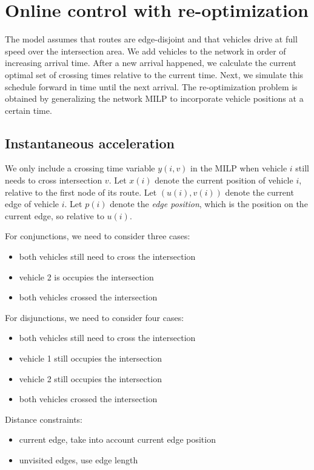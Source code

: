 \documentclass[a4paper]{article}
\author{Jeroen van Riel}
\date{\monthyeardate\today}
\title{}
\theoremstyle{definition}
\theoremstyle{plain}
\begin{document}
\section*{Online control with re-optimization}

The model assumes that routes are edge-disjoint and that vehicles drive at full
speed over the intersection area.
%
We add vehicles to the network in order of increasing arrival time. After a new
arrival happened, we calculate the current optimal set of crossing times
relative to the current time. Next, we simulate this schedule forward in time
until the next arrival.
%
The re-optimization problem is obtained by generalizing the network MILP to
incorporate vehicle positions at a certain time.

\subsection*{Instantaneous acceleration}

We only include a crossing time variable $y(i, v)$ in the MILP when vehicle $i$
still needs to cross intersection $v$.
Let $x(i)$ denote the current position of vehicle $i$, relative to the first
node of its route. Let $(u(i), v(i))$ denote the current edge of vehicle $i$.
Let $p(i)$ denote the \textit{edge position}, which is the position on the
current edge, so relative to $u(i)$.

\vspace{1em}
\noindent
For conjunctions, we need to consider three cases:
\begin{itemize}
 \item both vehicles still need to cross the intersection
 \item vehicle 2 is occupies the intersection
 \item both vehicles crossed the intersection
\end{itemize}

\noindent
For disjunctions, we need to consider four cases:
\begin{itemize}
 \item both vehicles still need to cross the intersection
 \item vehicle 1 still occupies the intersection
 \item vehicle 2 still occupies the intersection
 \item both vehicles crossed the intersection
\end{itemize}


\noindent
Distance constraints:
\begin{itemize}
 \item current edge, take into account current edge position
 \item unvisited edges, use edge length
\end{itemize}
\end{document}
